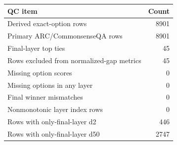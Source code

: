 \begin{tabular}{@{}lr@{}}
\toprule
\textbf{QC item} & \textbf{Count} \\
\midrule
Derived exact-option rows & 8901 \\
Primary ARC/CommonsenseQA rows & 8901 \\
Final-layer top ties & 45 \\
Rows excluded from normalized-gap metrics & 45 \\
Missing option scores & 0 \\
Missing options in any layer & 0 \\
Final winner mismatches & 0 \\
Nonmonotonic layer index rows & 0 \\
Rows with only-final-layer d2 & 446 \\
Rows with only-final-layer d50 & 2747 \\
\bottomrule
\end{tabular}
